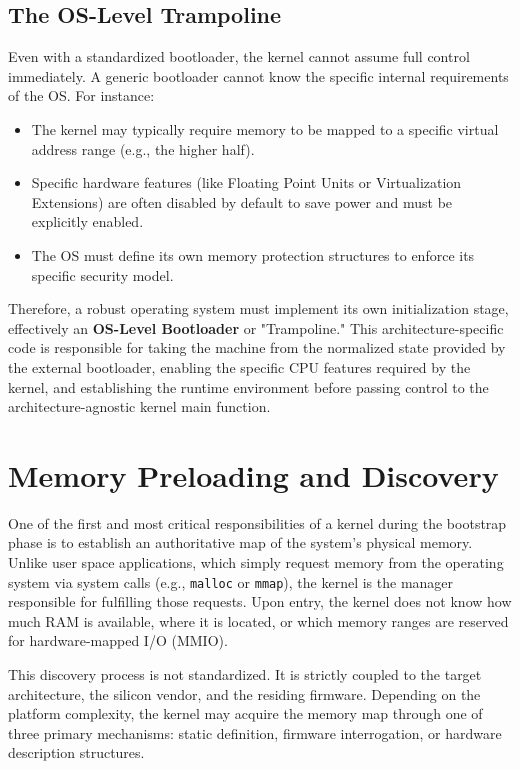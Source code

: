 \documentclass[a4paper,10pt,twoside]{report}
\theoremstyle{definition}
\begin{document}
\subsection{The OS-Level Trampoline}
Even with a standardized bootloader, the kernel cannot assume full control immediately. A generic bootloader cannot know the specific internal requirements of the OS. For instance:
\begin{itemize}
    \item The kernel may typically require memory to be mapped to a specific virtual address range (e.g., the higher half).
    \item Specific hardware features (like Floating Point Units or Virtualization Extensions) are often disabled by default to save power and must be explicitly enabled.
    \item The OS must define its own memory protection structures to enforce its specific security model.
\end{itemize}

Therefore, a robust operating system must implement its own initialization stage, effectively an \textbf{OS-Level Bootloader} or "Trampoline." This architecture-specific code is responsible for taking the machine from the normalized state provided by the external bootloader, enabling the specific CPU features required by the kernel, and establishing the runtime environment before passing control to the architecture-agnostic kernel main function.

\section{Memory Preloading and Discovery}
\label{sec:mem_discovery}
One of the first and most critical responsibilities of a kernel during the bootstrap phase is to establish an authoritative map of the system's physical memory. Unlike user space applications, which simply request memory from the operating system via system calls (e.g., \texttt{malloc} or \texttt{mmap}), the kernel is the manager responsible for fulfilling those requests. Upon entry, the kernel does not know how much RAM is available, where it is located, or which memory ranges are reserved for hardware-mapped I/O (MMIO).

This discovery process is not standardized. It is strictly coupled to the target architecture, the silicon vendor, and the residing firmware. Depending on the platform complexity, the kernel may acquire the memory map through one of three primary mechanisms: static definition, firmware interrogation, or hardware description structures.
\end{document}
